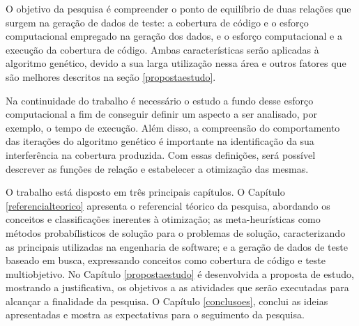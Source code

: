 O objetivo da pesquisa é compreender o ponto de equilíbrio de duas relações que surgem na geração de dados de teste: a cobertura de código e o esforço computacional empregado na geração dos dados, e o esforço computacional e a execução da cobertura de código. Ambas características serão aplicadas à algoritmo genético, devido a sua larga utilização nessa área e outros fatores que são melhores descritos na seção \ref{propostaestudo}.

Na continuidade do trabalho é necessário o estudo a fundo desse esforço computacional a fim de conseguir definir um aspecto a ser analisado, por exemplo, o tempo de execução. Além disso, a compreensão do comportamento das iterações do algoritmo genético é importante na identificação da sua interferência na cobertura produzida. Com essas definições, será possível descrever as funções de relação e estabelecer a otimização das mesmas. 

O trabalho está disposto em três principais capítulos. O Capítulo \ref{referencialteorico} apresenta o referencial téorico da pesquisa, abordando os conceitos e classificações inerentes à otimização; as meta-heurísticas como métodos probabílisticos de solução para o problemas de solução, caracterizando as principais utilizadas na engenharia de software; e a geração de dados de teste baseado em busca, expressando conceitos como cobertura de código e teste multiobjetivo. No Capítulo \ref{propostaestudo} é desenvolvida a proposta de estudo, mostrando a justificativa, os objetivos a as atividades que serão executadas para alcançar a finalidade da pesquisa. O Capítulo \ref{conclusoes}, conclui as ideias apresentadas e mostra as expectativas para o seguimento da pesquisa.

 





